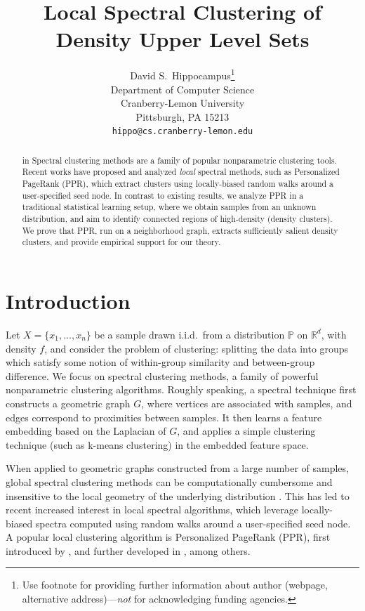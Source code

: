 \documentclass{article}
\title{Local Spectral Clustering of Density Upper Level Sets}
\author{%
  David S.~Hippocampus\thanks{Use footnote for providing further information
    about author (webpage, alternative address)---\emph{not} for acknowledging
    funding agencies.} \\
  Department of Computer Science\\
  Cranberry-Lemon University\\
  Pittsburgh, PA 15213 \\
  \texttt{hippo@cs.cranberry-lemon.edu} \\
}
\newcommand{\Reals}{\mathbb{R}}
\newcommand{\Rd}{\Reals^d}
\newcommand{\1}{\mathbf{1}}
\newcommand{\Xbf}{X}             %
\newcommand{\Pbb}{\mathbb{P}}
\newcommand{\ppr}{{\sc PPR}}
\theoremstyle{aldenthm}
\theoremstyle{aldenrmrk}
\begin{document}
\maketitle

\begin{abstract}
 in
  Spectral clustering methods are a family of popular nonparametric clustering
  tools.  Recent works have proposed and analyzed \emph{local} spectral methods, such as Personalized PageRank (\ppr),
  which extract clusters using locally-biased random walks around a user-specified
  seed node.  In contrast to existing results, we analyze PPR in a traditional
  statistical learning setup, where we obtain samples from an unknown
  distribution, and aim to identify connected regions of high-density (density
  clusters).  We prove that PPR, run on a neighborhood graph, extracts
  sufficiently salient density clusters, and provide empirical support for our theory.
\end{abstract}

\section{Introduction}
\label{sec: introduction}

Let $\Xbf = \{x_1, \ldots, x_n\}$ be a sample drawn i.i.d.\ from a
distribution $\Pbb$ on $\Rd$, with density $f$, and consider the problem of 
clustering: splitting the data into groups which satisfy some notion of
within-group similarity and between-group difference.  We focus on spectral
clustering methods, a family of powerful nonparametric clustering algorithms.
Roughly speaking, a spectral technique first constructs a geometric graph $G$,
where vertices are associated with samples, and edges correspond to proximities
between samples. It then learns a feature embedding based on the Laplacian of
$G$, and applies a simple clustering technique (such as k-means clustering) in
the embedded feature space.

When applied to geometric graphs constructed from a large number of samples,
global spectral clustering methods can be computationally cumbersome and   
insensitive to the local geometry of the underlying distribution
\citep{leskovec2010,mahoney2012}.  This has led to recent increased interest in
local spectral algorithms, which leverage locally-biased spectra computed using
random walks around a user-specified seed node.  A popular local clustering
algorithm is Personalized PageRank (\ppr), first introduced by
\citet{haveliwala2003}, and further developed in
\citep{spielman2011,spielman2014,andersen2006,mahoney2012,zhu2013},
among others.  
\end{document}
